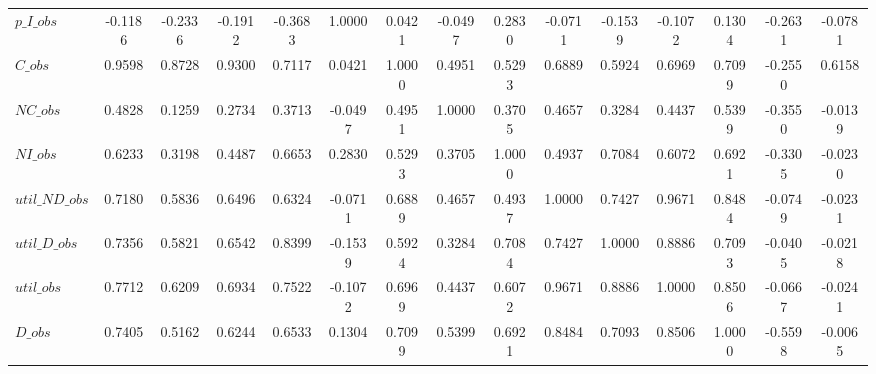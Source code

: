 \begin{center}
\begin{longtable}{lcccccccccccccc}
$p\_I\_obs      $	 & 	          -0.1186	 & 	          -0.2336	 & 	          -0.1912	 & 	          -0.3683	 & 	           1.0000	 & 	           0.0421	 & 	          -0.0497	 & 	           0.2830	 & 	          -0.0711	 & 	          -0.1539	 & 	          -0.1072	 & 	           0.1304	 & 	          -0.2631	 & 	          -0.0781 \\ 
$C\_obs         $	 & 	           0.9598	 & 	           0.8728	 & 	           0.9300	 & 	           0.7117	 & 	           0.0421	 & 	           1.0000	 & 	           0.4951	 & 	           0.5293	 & 	           0.6889	 & 	           0.5924	 & 	           0.6969	 & 	           0.7099	 & 	          -0.2550	 & 	           0.6158 \\ 
$NC\_obs        $	 & 	           0.4828	 & 	           0.1259	 & 	           0.2734	 & 	           0.3713	 & 	          -0.0497	 & 	           0.4951	 & 	           1.0000	 & 	           0.3705	 & 	           0.4657	 & 	           0.3284	 & 	           0.4437	 & 	           0.5399	 & 	          -0.3550	 & 	          -0.0139 \\ 
$NI\_obs        $	 & 	           0.6233	 & 	           0.3198	 & 	           0.4487	 & 	           0.6653	 & 	           0.2830	 & 	           0.5293	 & 	           0.3705	 & 	           1.0000	 & 	           0.4937	 & 	           0.7084	 & 	           0.6072	 & 	           0.6921	 & 	          -0.3305	 & 	          -0.0230 \\ 
$util\_ND\_obs  $	 & 	           0.7180	 & 	           0.5836	 & 	           0.6496	 & 	           0.6324	 & 	          -0.0711	 & 	           0.6889	 & 	           0.4657	 & 	           0.4937	 & 	           1.0000	 & 	           0.7427	 & 	           0.9671	 & 	           0.8484	 & 	          -0.0749	 & 	          -0.0231 \\ 
$util\_D\_obs   $	 & 	           0.7356	 & 	           0.5821	 & 	           0.6542	 & 	           0.8399	 & 	          -0.1539	 & 	           0.5924	 & 	           0.3284	 & 	           0.7084	 & 	           0.7427	 & 	           1.0000	 & 	           0.8886	 & 	           0.7093	 & 	          -0.0405	 & 	          -0.0218 \\ 
$util\_obs      $	 & 	           0.7712	 & 	           0.6209	 & 	           0.6934	 & 	           0.7522	 & 	          -0.1072	 & 	           0.6969	 & 	           0.4437	 & 	           0.6072	 & 	           0.9671	 & 	           0.8886	 & 	           1.0000	 & 	           0.8506	 & 	          -0.0667	 & 	          -0.0241 \\ 
$D\_obs         $	 & 	           0.7405	 & 	           0.5162	 & 	           0.6244	 & 	           0.6533	 & 	           0.1304	 & 	           0.7099	 & 	           0.5399	 & 	           0.6921	 & 	           0.8484	 & 	           0.7093	 & 	           0.8506	 & 	           1.0000	 & 	          -0.5598	 & 	          -0.0065 \\ 

\end{longtable}
\end{center}
